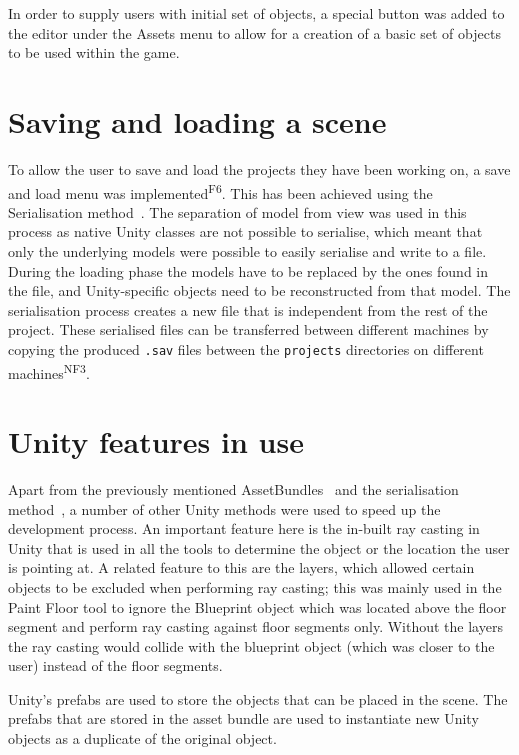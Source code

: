 In order to supply users with initial set of objects, a special button was added to the editor under the Assets menu to allow for a creation of a basic set of objects to be used within the game.

\section{Saving and loading a scene}
\label{sec:saving}
To allow the user to save and load the projects they have been working on, a save and load menu was implemented\textsuperscript{F6}. This has been achieved using the Serialisation method~\cite{unity:serialization}. The separation of model from view was used in this process as native Unity classes are not possible to serialise, which meant that only the underlying models were possible to easily serialise and write to a file. During the loading phase the models have to be replaced by the ones found in the file, and Unity-specific objects need to be reconstructed from that model. The serialisation process creates a new file that is independent from the rest of the project. These serialised files can be transferred between different machines by copying the produced \verb|.sav| files between the \verb|projects| directories on different machines\textsuperscript{NF3}.

\section{Unity features in use}
Apart from the previously mentioned AssetBundles~\cite{unity:assetbundle} and the serialisation method~\cite{unity:serialization}, a number of other Unity methods were used to speed up the development process. An important feature here is the in-built ray casting in Unity that is used in all the tools to determine the object or the location the user is pointing at. A related feature to this are the layers, which allowed certain objects to be excluded when performing ray casting; this was mainly used in the Paint Floor tool to ignore the Blueprint object which was located above the floor segment and perform ray casting against floor segments only. Without the layers the ray casting would collide with the blueprint object (which was closer to the user) instead of the floor segments.

Unity's prefabs are used to store the objects that can be placed in the scene. The prefabs that are stored in the asset bundle are used to instantiate new Unity objects as a duplicate of the original object.

